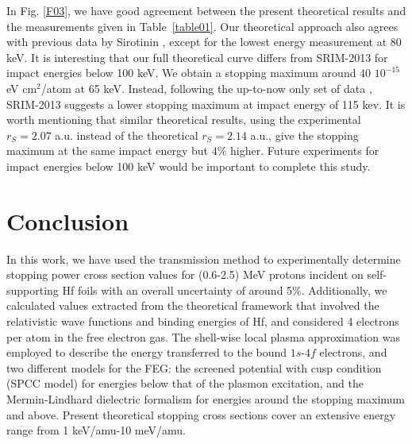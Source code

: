 \documentclass[aps,prb,reprint,groupedaddress]{revtex4-1}
\begin{document}
In Fig. \ref{F03}, we have good agreement between the present theoretical results and the measurements given in Table~\ref{table01}. Our theoretical approach also agrees with previous data by Sirotinin \cite{Sirotinin}, except for the lowest energy measurement at 80 keV. It is interesting that our full theoretical curve differs from SRIM-2013 for impact energies below 100 keV. We obtain a stopping maximum around 40 $10^{-15}$ eV cm$^2$/atom  at 65 keV. Instead, following the up-to-now only set of data \cite{Sirotinin}, SRIM-2013 suggests a lower stopping maximum %
at impact energy of 115 kev. It is worth mentioning that similar theoretical results, using the experimental $r_S=2.07$ a.u. instead of the theoretical $r_S=2.14$ a.u., give the stopping maximum at the same impact energy but $4\%$ higher. Future experiments for impact energies below 100 keV would be important to complete this study.


\section{Conclusion}
\label{conclusion}
In this work, we have used the transmission method to experimentally determine stopping power cross section values for (0.6-2.5) MeV protons incident on self-supporting Hf foils with an overall uncertainty of around 5\%. Additionally, we calculated values extracted from the theoretical framework that involved the relativistic wave functions and binding energies of Hf, and considered 4 electrons per atom in the free electron gas. The shell-wise local plasma approximation was employed to describe the energy transferred to the bound $1s$-$4f$ electrons, and two different models for the FEG: the screened potential with cusp condition (SPCC model) for energies below that of the plasmon excitation, and the Mermin-Lindhard dielectric formalism for energies around the stopping maximum and above. Present theoretical stopping cross sections cover an extensive energy range from 1 keV/amu-10 meV/amu.
\end{document}
